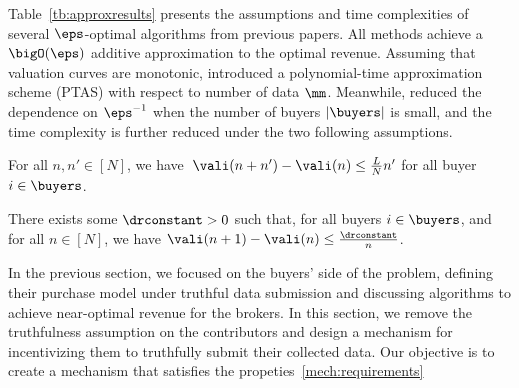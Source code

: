 Table~\ref{tb:approxresults} presents the assumptions and time complexities of several $\eps$-optimal algorithms from previous papers. All methods achieve a $\bigO(\eps)$ additive approximation to the optimal revenue.  %
Assuming that valuation curves are monotonic, \citet{chawla2022pricing} introduced a polynomial-time approximation scheme (PTAS) with respect to number of data $\mm$. Meanwhile,  \citet{chen2024learning} reduced the dependence on $\eps^{-1}$ when the number of buyers $|\buyers|$ is small, and the time complexity is further reduced under the two following assumptions.

\begin{assumption}[Smoothness]
    \label{asm:smoothness}
    For all $n, n' \in [N]$, we have
    $ \;\vali(n+n') - \vali(n)\leq 
        \frac{L}{N}n'$ for all buyer $i \in \buyers$.
\end{assumption}

\begin{assumption}
    \label{asm:diminishingreturns} 
    There exists some $\drconstant>0$ such that,
    for all buyers $i\in \buyers$, and for all $n\in[N]$,
    we have $\vali(n+1) - \vali(n) \leq \frac{\drconstant}{n}$.

\end{assumption}




In the previous section, we focused on the buyers’ side of the problem, defining their purchase model under truthful data submission and discussing algorithms to achieve near-optimal revenue for the brokers. 
In this section, we remove the truthfulness assumption on the contributors and design a mechanism for incentivizing them to truthfully submit their collected data.
Our objective is to create a mechanism 
that satisfies the propeties~\ref{mech:requirements}


